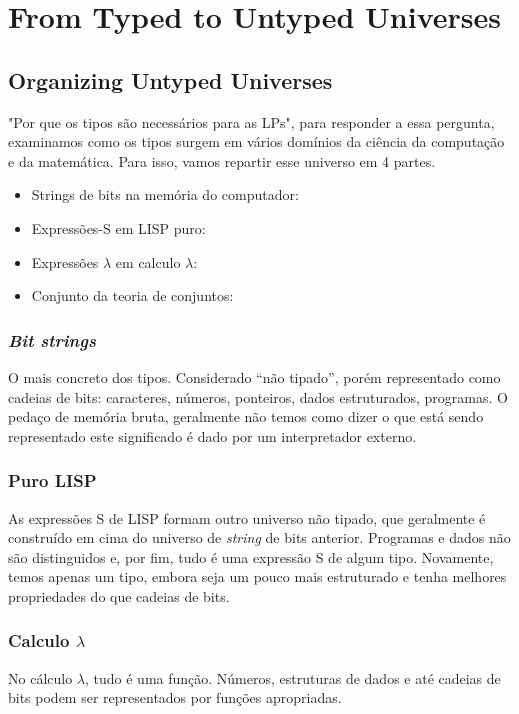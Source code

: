 \section{From Typed to Untyped Universes}

\subsection{Organizing Untyped Universes}
"Por que os tipos são necessários para  as LPs", para responder a essa pergunta, examinamos como os tipos surgem em vários domínios da ciência da computação e da matemática.
Para isso, vamos repartir esse universo em 4 partes.
\begin{itemize}
    \item Strings de bits na memória do computador:
    \item Expressões-S em LISP puro:
    \item Expressões $\lambda$ em calculo $\lambda$:
    \item Conjunto da teoria de conjuntos:
\end{itemize}
\subsubsection{\textit{Bit strings}}
O mais concreto dos tipos. Considerado “não tipado”, porém representado como cadeias de bits: caracteres, números, ponteiros, dados estruturados, programas.
O pedaço de memória bruta, geralmente não temos como dizer o que está sendo representado este significado é dado por um interpretador externo.

\subsubsection{Puro LISP}
As expressões S de LISP formam outro universo não tipado, que geralmente é construído em cima do universo de \textit{string} de bits anterior. Programas e dados não são distinguidos e, por fim, tudo é uma expressão S de algum tipo.
Novamente, temos apenas um tipo, embora seja um pouco mais estruturado e tenha melhores propriedades do que cadeias de bits.

\subsubsection{Calculo $\lambda$}
No cálculo $\lambda$, tudo é uma função. Números, estruturas de dados e até cadeias de bits podem ser representados por funções apropriadas.

